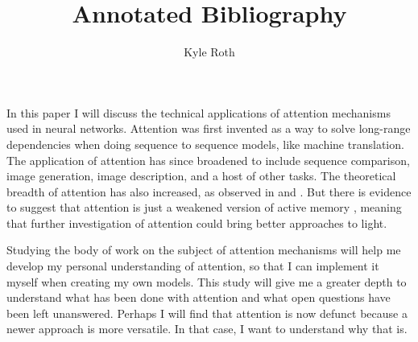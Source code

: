 \documentclass[11pt]{article}
\author{Kyle Roth}
\title{Annotated Bibliography}
\begin{document}
\maketitle

In this paper I will discuss the technical applications of attention mechanisms used in neural networks. Attention was first invented as a way to solve long-range dependencies when doing sequence to sequence models, like machine translation. The application of attention has since broadened to include sequence comparison, image generation, image description, and a host of other tasks. The theoretical breadth of attention has also increased, as observed in \cite{attn_all_you_need} and \cite{structured_attention_net}. But there is evidence to suggest that attention is just a weakened version of active memory \cite{active_memory}, meaning that further investigation of attention could bring better approaches to light.

Studying the body of work on the subject of attention mechanisms will help me develop my personal understanding of attention, so that I can implement it myself when creating my own models. This study will give me a greater depth to understand what has been done with attention and what open questions have been left unanswered. Perhaps I will find that attention is now defunct because a newer approach is more versatile. In that case, I want to understand why that is.

\nocite{*}



\end{document}
